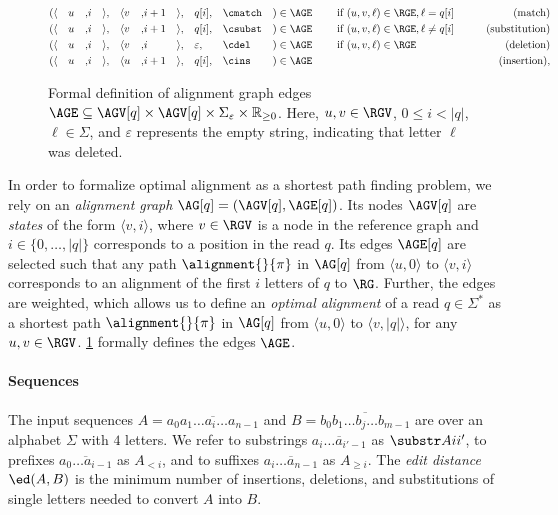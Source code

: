 \begin{figure}[t]
	\begin{alignat*}{20}
		(
			&\langle&& u &,& i   &\rangle&,
			&\langle&  v &,& i+1 &\rangle&,
			&&q[i],
			&&\cmatch
		&)&\in \AGE
		&& \quad \text{ if } (u,v,\ell) \in \RGE, \ell = q[i] & \qquad \text{(match)}\\
		(
			&\langle&& u &,& i   &\rangle&,
			&\langle&  v &,& i+1 &\rangle&,
			&&q[i],
			&&\csubst
		&) &\in \AGE
		&& \quad \text{ if } (u,v,\ell) \in \RGE, \ell \neq q[i] & \qquad \text{(substitution)}\\
		(
			&\langle&& u &,& i &\rangle&,
			&\langle&  v &,& i &\rangle&,
			&&\varepsilon,
			&&\cdel
		&) &\in \AGE
		&& \quad \text{ if } (u,v,\ell) \in \RGE & \qquad \text{(deletion)}\\
		(
			&\langle&& u &,& i   &\rangle&,
			&\langle&  u &,& i+1 &\rangle&,
			&&q[i],
			&&\cins
		&) &\in \AGE
		&& \quad & \qquad \text{(insertion)},
	\end{alignat*}
	\caption[Formal definition of alignment graph]{Formal definition of
	alignment graph edges $\AGE \subseteq \AGV[q] \times \AGV[q] \times
	\Sigma_\varepsilon \times \mathbb{R}_{\geq 0}$. Here, $u,v \in \RGV$, $0
	\leq i < |q|$, $\ell \in \Sigma$, and $\varepsilon$ represents the empty
	string, indicating that letter $\ell$ was deleted.}
	\label{SEEDfig:graph-edges}
\end{figure}

%
In order to formalize optimal alignment as a shortest path finding problem, we
rely on an \emph{alignment graph} $\AG[q]=(\AGV[q],\AGE[q])$.
%
Its nodes $\AGV[q]$ are \emph{states} of the form $\langle v, i \rangle$, where
$v \in \RGV$ is a node in the reference graph and $i \in \{0, \dots, |q|\}$
corresponds to a position in the read $q$.
%
Its edges $\AGE[q]$ are selected such that any path $\alignment{}{\pi}$ in
$\AG[q]$ from $\langle u, 0 \rangle$ to $\langle v, i \rangle$ corresponds to an
alignment of the first $i$ letters of $q$ to $\RG$.
%
Further, the edges are weighted, which allows us to define an \emph{optimal
alignment} of a read $q \in \Sigma^*$ as a shortest path $\alignment{}{\pi}$ in
$\AG[q]$ from $\langle u, 0 \rangle$ to $\langle v, |q| \rangle$, for any $u, v
\in \RGV$.
%
\cref{SEEDfig:graph-edges} formally defines the edges $\AGE$.

\paragraph{Sequences}
The input sequences $A = \overline{a_0a_1\dots a_i \dots a_{n-1}}$ and $B =
\overline{b_0b_1 \dots b_j \dots b_{m-1}}$ are over an alphabet $\Sigma$ with
$4$ letters. We refer to substrings $\overline{a_i \dots a_{i'-1}}$ as
$\substr Ai{i'}$, to prefixes $\overline{a_0 \dots a_{i-1}}$ as $A_{<i}$, and to
suffixes $\overline{a_i \dots a_{n-1}}$ as $A_{\geq i}$. The \emph{edit
distance} $\ed(A,B)$ is the minimum number of insertions, deletions, and
substitutions of single letters needed to convert $A$ into $B$.

